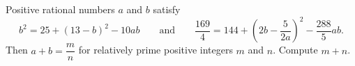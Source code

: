 Positive rational numbers $a$ and $b$ satisfy
\[b^2=25+(13-b)^2-10ab\qquad\text{and}\qquad\dfrac{169}{4}=144+\left(2b-\dfrac{5}{2a}\right)^2-\dfrac{288}{5}ab.\]
Then $a+b=\dfrac mn$ for relatively prime positive integers $m$ and $n$. Compute $m+n$.
